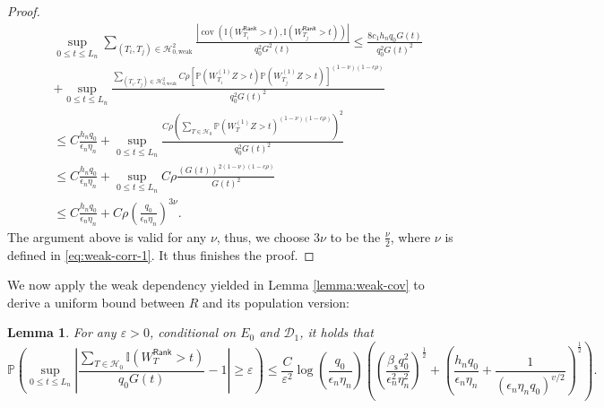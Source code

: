 \documentclass[12pt]{article}
\newcommand{\abs}[1]{\left\lvert#1\right\rvert}
\newcommand{\PP}{\mathbb{P}}
\newcommand{\cH}{\mathcal{H}}
\newcommand{\cD}{\mathcal{D}}
\newcommand{\bbI}{\mathbb{I}}
\def\PP{{\mathbb P}}
\newtheorem{Lemma}{Lemma}
\theoremstyle{plain}
\begin{document}
\begin{proof}
\begin{equation*}
\begin{aligned}
       &\sup_{0\le t\le L_n } \sum_{(T_i,T_j)\in \cH_{0,\text{weak} }^2 }\frac{ \abs{\operatorname{cov}(\bbI(W_{T_i}^{\mathsf{Rank} }>t),\bbI(W_{T_j}^{\mathsf{Rank} }>t)) }}{q_0^2 G^2(t)}\le  \frac{8c_1 h_n q_0 G(t)  }{q_0^2 G(t)^2} \\
       & +\sup_{0\le t\le L_n }\frac{ \sum_{(T_i,T_j)\in\cH_{0,\text{weak}} ^2 } C\rho \left[\PP({W}^{(1)}_{T_i} Z >t )\PP({W}^{(1)}_{T_j} Z>t)\right]^{(1-\nu)(1-c\rho) }  }{q_0^2 G(t)^2}\\
       & \le  C \frac{h_n q_0}{\epsilon_n \eta_n } + \sup_{0\le t\le L_n }\frac{ C\rho \left(\sum_{T\in \cH_0 }\PP({W}^{(1)}_{T} Z >t )^{(1-\nu)(1-c\rho) }\right)^2  }{q_0^2 G(t)^2} \\ 
       & \le  C \frac{h_n q_0}{\epsilon_n \eta_n } + \sup_{0\le t\le L_n }C\rho \frac{ \left( G(t) \right)^{2(1-\nu)(1-c\rho) }  }{ G(t)^2} \\
       & \le  C \frac{h_n q_0}{\epsilon_n \eta_n } +C {\rho}( \frac{q_0}{\epsilon_n\eta_n})^{3\nu}.
\end{aligned}
\end{equation*}
The argument above is valid for any $\nu$, thus, we choose $3\nu$ to be the $\frac{\nu}{2}$, where $\nu$ is defined in \eqref{eq:weak-corr-1}. It thus finishes the proof.
\end{proof}
We now apply the weak dependency yielded in Lemma \ref{lemma:weak-cov} to derive a uniform bound between $R$ and its population version: 

\begin{Lemma}\label{lemma:conv-prob}
For any $\varepsilon>0$, conditional on $E_0$ and $\cD_1$, it holds that
\begin{equation*}
   \PP\left(\sup\limits_{0\le t\le L_n}\abs{\frac{ \sum_{T\in\cH_0}\bbI(W_T^{\mathsf{Rank} }>t ) }{q_0 G(t) } -1} \ge \varepsilon\right) \le \frac{C}{\varepsilon^2} \log(\frac{q_0 }{\epsilon_n \eta_n}) \left( \left(\frac{\beta_{\mathsf{s}} q_0^2 }{ \epsilon_n^2\eta_n^2}\right)^{\frac{1}{2}} + \left(\frac{h_n q_0}{\epsilon_n \eta_n}+ \frac{1}{ \left(\epsilon_n\eta_n q_0\right)^{v/2} } \right)^{\frac{1}{2}}\right) .
\end{equation*}
\end{Lemma}
\end{document}
